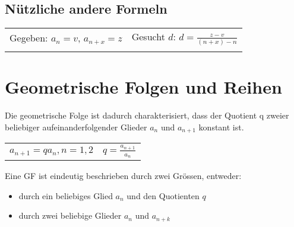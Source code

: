 \documentclass[../main.tex]{subfiles}
\begin{document}
\subsection{Nützliche andere Formeln}

\begin{tabularx}{1\textwidth} { 
    >{\centering\arraybackslash}X 
    >{\centering\arraybackslash}X  }
    Gegeben: $a_n = v$, $a_{n+x} = z$
    &
    Gesucht $d$: $d = \frac{z - v}{(n+x) -n}$
    \\ [7pt]
    \begin{math}
        {}
    \end{math}
    &
    \begin{math}
        {}
    \end{math}
    \\ [7pt]
\end{tabularx}


\section{Geometrische Folgen und Reihen}
\begin{flushleft}
    Die geometrische Folge ist dadurch charakterisiert, dass der Quotient q zweier beliebiger aufeinanderfolgender Glieder $a_n$ und $a_{n+1}$ konstant ist.
\end{flushleft}

\begin{tabularx}{0.8\textwidth} { 
    >{\centering\arraybackslash}X 
    >{\centering\arraybackslash}X  }
    \begin{math}
        a_{n+1} = qa_n, n=1,2
    \end{math}
    &
    \begin{math}
        q = \frac{a_{n+1}}{a_n}
    \end{math}
    \\ [7pt]
\end{tabularx}

Eine GF ist eindeutig beschrieben durch zwei Grössen, entweder:
\begin{itemize}
    \item durch ein beliebiges Glied $a_n$ und den Quotienten $q$
    \item durch zwei beliebige Glieder $a_n$ und $a_{n+k}$
\end{itemize}
\end{document}
